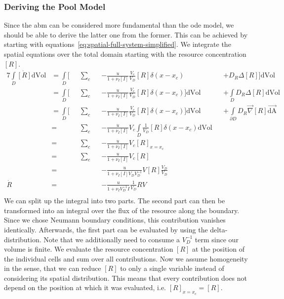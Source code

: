 \documentclass[10pt,twocolumn,5p]{elsarticle}
\numberwithin{equation}{section}
\begin{document}
\subsubsection*{Deriving the Pool Model}
\label{subsec:supplement-deriving-pool-odes}
Since the \ac{abm} can be considered more fundamental than the \ac{ode} model, we should be able to derive the latter one from the former.
This can be achieved by starting with equations~\eqref{eq:spatial-full-system-simplified}.
We integrate the spatial equations over the total domain starting with the resource concentration $[R]$.
\begin{alignat}{7}
    \int\limits_D\dot{[R]}\text{dVol} 
    &= \int\limits_D\bigg[&&\sum\limits_c &&-\frac{u}{1+\nu_I [I]} \frac{V_c}{V_D} [R] \delta(x-x_c) &&+ D_R\Delta [R]\bigg]\text{dVol}\\
    &= \int\limits_D\bigg[&&\sum\limits_c &&-\frac{u}{1+\nu_I [I]} \frac{V_c}{V_D} [R] \delta(x-x_c)\bigg]\text{dVol} &&+ \int\limits_D D_R\Delta [R]\text{dVol}\\
    &= \int\limits_D\bigg[&&\sum\limits_c &&-\frac{u}{1+\nu_I [I]} \frac{V_c}{V_D} [R] \delta(x-x_c)\bigg]\text{dVol} &&+ \int\limits_{\partial D} D_R\vec{\nabla} [R]\vec{\text{dA}}\\
    &= &&\sum\limits_c &&-\frac{u}{1+\nu_I [I]} V_c \int\limits_D \frac{1}{V_D} [R] \delta(x-x_c)\text{dVol}\\
    &= &&\sum\limits_c &&-\frac{u}{1+\nu_I [I]} V_c [R]_{x=x_c}\\
    &= &&\sum\limits_c &&-\frac{u}{1+\nu_I [I]} V_c [R]\\
    &= &&&&-\frac{u}{1+\nu_I [I]V_D V_D^{-1}} V [R]\frac{V_D}{V_D}\\
    \dot{R} &= &&&&-\frac{u}{1+\nu_I V_D^{-1}I} \frac{1}{V_D} R V\\
\end{alignat}
We can split up the integral into two parts.
The second part can then be transformed into an integral over the flux of the resource along the boundary.
Since we chose Neumann boundary conditions, this contribution vanishes identically.
Afterwards, the first part can be evaluated by using the delta-distribution.
Note that we additionally need to consume a $V_D^{-1}$ term since our volume is finite.
We evaluate the resource concentration $[R]$ at the position of the individual cells and sum over all contributions.
Now we assume homogeneity in the sense, that we can reduce $[R]$ to only a single variable instead of considering its spatial distribution.
This means that every contribution does not depend on the position at which it was evaluated, i.e. $[R]_{x=x_c}=[R]$.
\end{document}
